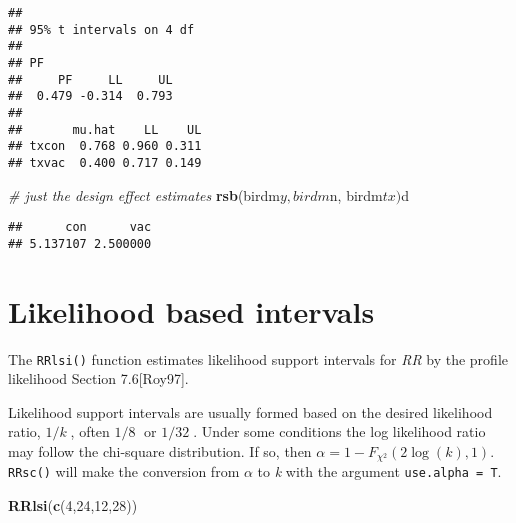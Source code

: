 \documentclass[]{article}
\newenvironment{Shaded}{\begin{snugshade}}{\end{snugshade}}
\newcommand{\KeywordTok}[1]{\textcolor[rgb]{0.13,0.29,0.53}{\textbf{{#1}}}}
\newcommand{\DataTypeTok}[1]{\textcolor[rgb]{0.13,0.29,0.53}{{#1}}}
\newcommand{\DecValTok}[1]{\textcolor[rgb]{0.00,0.00,0.81}{{#1}}}
\newcommand{\CommentTok}[1]{\textcolor[rgb]{0.56,0.35,0.01}{\textit{{#1}}}}
\newcommand{\NormalTok}[1]{{#1}}
\begin{document}
\begin{Shaded}
\end{Shaded}

\begin{verbatim}
## 
## 95% t intervals on 4 df
## 
## PF 
##     PF     LL     UL 
##  0.479 -0.314  0.793 
## 
##       mu.hat    LL    UL
## txcon  0.768 0.960 0.311
## txvac  0.400 0.717 0.149
\end{verbatim}

\begin{Shaded}
\begin{Highlighting}[]
\CommentTok{# just the design effect estimates}
\KeywordTok{rsb}\NormalTok{(birdm$y, birdm$n, birdm$tx)$d}
\end{Highlighting}
\end{Shaded}

\begin{verbatim}
##      con      vac 
## 5.137107 2.500000
\end{verbatim}

\section{Likelihood based intervals}

The \texttt{RRlsi()} function estimates likelihood support intervals for
\emph{RR} by the profile likelihood Section 7.6{[}Roy97{]}.

Likelihood support intervals are usually formed based on the desired
likelihood ratio, \({1}/{k}\;\), often \({1}/{8}\;\) or \({1}/{32}\;\).
Under some conditions the log likelihood ratio may follow the chi-square
distribution. If so, then
\(\alpha =1-{{F}_{{{\chi }^{2}}}}\left( 2\log (k),1 \right)\).
\texttt{RRsc()} will make the conversion from \(\alpha\) to \emph{k}
with the argument \texttt{use.alpha = T}.

\bigskip

\begin{Shaded}
\begin{Highlighting}[]
\KeywordTok{RRlsi}\NormalTok{(}\KeywordTok{c}\NormalTok{(}\DecValTok{4}\NormalTok{,}\DecValTok{24}\NormalTok{,}\DecValTok{12}\NormalTok{,}\DecValTok{28}\NormalTok{))}
\end{Highlighting}
\end{Shaded}
\end{document}
